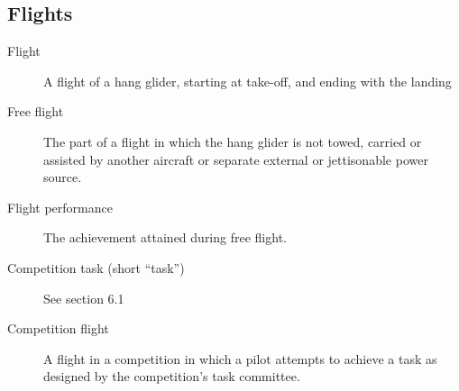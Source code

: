 \documentclass{article}
\begin{document}
\subsection{Flights}
\begin{description}
    \item [Flight]
        A flight of a hang glider, starting at take-off, and ending with the
        landing
    \item [Free flight]
        The part of a flight in which the hang glider is not towed, carried or
        assisted by another aircraft or separate external or jettisonable power
        source.
    \item [Flight performance]
        The achievement attained during free flight.
    \item [Competition task (short “task”)]
        See section 6.1
    \item [Competition flight]
        A flight in a competition in which a pilot attempts to achieve a task
        as designed by the competition’s task committee.
\end{description}
\end{document}

